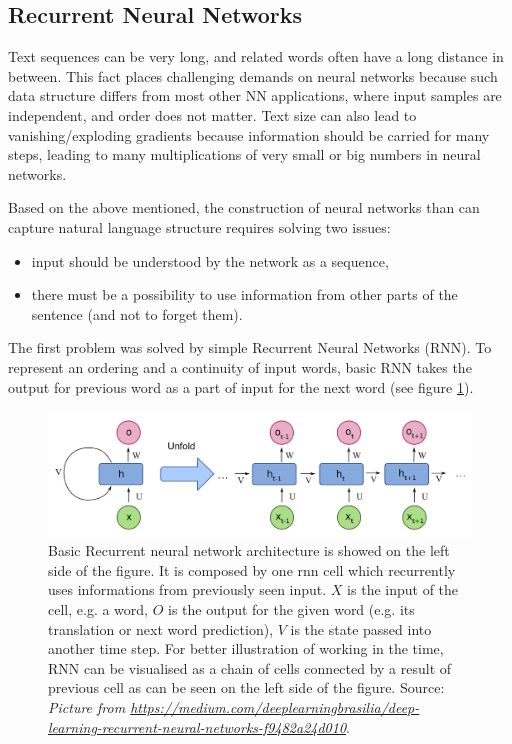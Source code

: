 \subsection{Recurrent Neural Networks}
\label{sub:RNN}
Text sequences can be very long, and related words often have a long distance in between. This fact places challenging demands on neural networks because such data structure differs from most other NN applications, where input samples are independent, and order does not matter. Text size can also lead to vanishing/exploding gradients because information should be carried for many steps, leading to many multiplications of very small or big numbers in neural networks. %
\par
Based on the above mentioned, the construction of neural networks than can capture natural language structure requires solving two issues:
\begin{itemize}
\item input should be understood by the network as a sequence,
\item there must be a possibility to use information from other parts of the sentence (and not to forget them).
\end{itemize}
The first problem was solved by simple Recurrent Neural Networks (RNN). To represent an ordering and a continuity of input words, basic RNN takes the output for previous word as a part of input for the next word (see figure \ref{pic:rnn}). 
 
\begin{figure}[H]
\centering
\includegraphics[width=1\columnwidth]{../img/rnn}
\protect\caption[The recurrent neural network architecture]{Basic Recurrent neural network architecture is showed on the left side of the figure. It is composed by one rnn cell which recurrently uses informations from previously seen input. $X$ is the input of the cell, e.g. a word, $O$ is the output for the given word (e.g. its translation or next word prediction), $V$ is the state passed into another time step. For better illustration of working in the time, RNN can be visualised as a chain of cells connected by a result of previous cell as can be seen on the left side of the figure. Source: \textit{Picture from \url{https://medium.com/deeplearningbrasilia/deep-learning-recurrent-neural-networks-f9482a24d010}}.}
\label{pic:rnn}
\end{figure}

